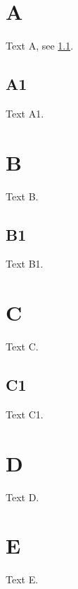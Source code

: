 \documentclass{article}
\begin{document}
\section{A}\label{x}
Text A, see \ref{y}.
\subsection{A1}\label{y}
Text A1.
\section{B}\label{y/}
Text B.
\subsection{B1}\label{x/}
Text B1.
\section{C}\label{S3.SS1}
Text C.
\subsection{C1}
Text C1.
\section{D}\label{S5}
Text D.
\section{E}
Text E.
\end{document}
